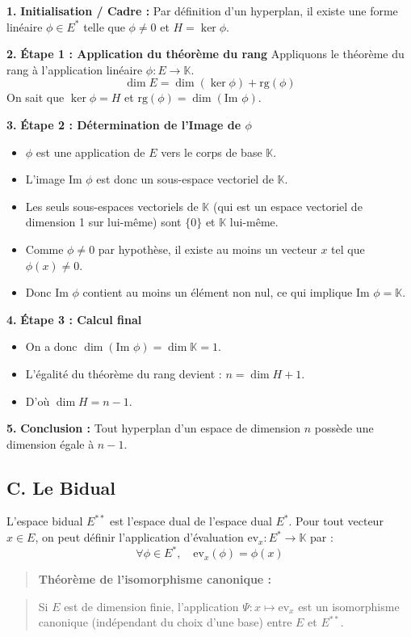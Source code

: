 \documentclass[12pt,a4paper]{report}
\begin{document}
\textbf{1.} \textbf{Initialisation / Cadre :} Par définition d'un hyperplan, il existe une forme linéaire $\phi \in E^*$ telle que $\phi \neq 0$ et $H = \ker \phi$.

\textbf{2.} \textbf{Étape 1 : Application du théorème du rang}
   Appliquons le théorème du rang à l'application linéaire $\phi : E \to \mathbb{K}$.
   $$\dim E = \dim(\ker \phi) + \text{rg}(\phi)$$
   On sait que $\ker \phi = H$ et $\text{rg}(\phi) = \dim(\text{Im } \phi)$.

\textbf{3.} \textbf{Étape 2 : Détermination de l'Image de $\phi$}
\begin{itemize}
\item $\phi$ est une application de $E$ vers le corps de base $\mathbb{K}$.
\item L'image $\text{Im } \phi$ est donc un sous-espace vectoriel de $\mathbb{K}$.
\item Les seuls sous-espaces vectoriels de $\mathbb{K}$ (qui est un espace vectoriel de dimension 1 sur lui-même) sont $\{0\}$ et $\mathbb{K}$ lui-même.
\item Comme $\phi \neq 0$ par hypothèse, il existe au moins un vecteur $x$ tel que $\phi(x) \neq 0$.
\item Donc $\text{Im } \phi$ contient au moins un élément non nul, ce qui implique $\text{Im } \phi = \mathbb{K}$.
\end{itemize}

\textbf{4.} \textbf{Étape 3 : Calcul final}
\begin{itemize}
\item On a donc $\dim(\text{Im } \phi) = \dim \mathbb{K} = 1$.
\item L'égalité du théorème du rang devient :
     $n = \dim H + 1$.
\item D'où $\dim H = n - 1$.
\end{itemize}

\textbf{5.} \textbf{Conclusion :} Tout hyperplan d'un espace de dimension $n$ possède une dimension égale à $n-1$.



\subsection*{C. Le Bidual}
L'espace bidual $E^{**}$ est l'espace dual de l'espace dual $E^*$.
Pour tout vecteur $x \in E$, on peut définir l'application d'évaluation $\text{ev}_x : E^* \to \mathbb{K}$ par :
$$\forall \phi \in E^*, \quad \text{ev}_x(\phi) = \phi(x)$$
\begin{quote}
\textbf{Théorème de l'isomorphisme canonique :}
\end{quote}
\begin{quote}
Si $E$ est de dimension finie, l'application $\Psi : x \mapsto \text{ev}_x$ est un isomorphisme canonique (indépendant du choix d'une base) entre $E$ et $E^{**}$.
\end{quote}
\end{document}
